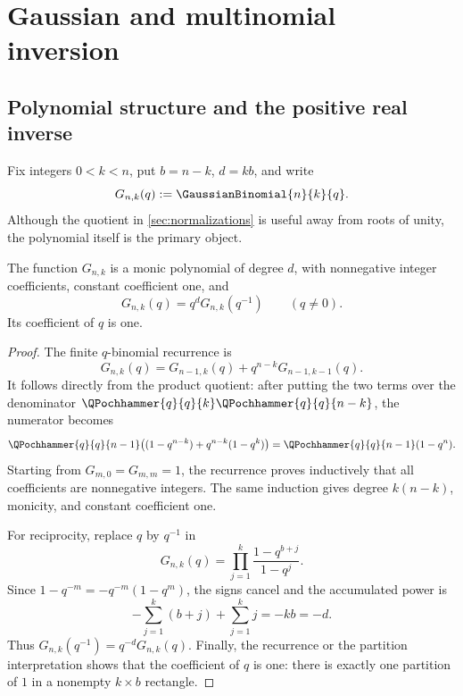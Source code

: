 \chapter{Gaussian and multinomial inversion}
\label{chap:gaussian-multinomial-inversion}

\section{Polynomial structure and the positive real inverse}
\label{sec:gaussian-polynomial}

Fix integers \(0<k<n\), put \(b=n-k\), \(d=kb\), and write
\[
  G_{n,k}(q):=\GaussianBinomial{n}{k}{q}.
\]
Although the quotient in \cref{sec:normalizations} is useful away from roots
of unity, the polynomial itself is the primary object.

\begin{proposition}
\label{prop:gq-positive-palindromic}
The function \(G_{n,k}\) is a monic polynomial of degree \(d\), with
nonnegative integer coefficients, constant coefficient one, and
\[
  G_{n,k}(q)=q^dG_{n,k}(q^{-1})\qquad(q\ne0).
\]
Its coefficient of \(q\) is one.
\end{proposition}

\begin{proof}
The finite \(q\)-binomial recurrence is
\[
  G_{n,k}(q)
  =G_{n-1,k}(q)+q^{n-k}G_{n-1,k-1}(q).
\]
It follows directly from the product quotient: after putting the two terms
over the denominator
\(\QPochhammer{q}{q}{k}\QPochhammer{q}{q}{n-k}\), the numerator becomes
\[
  \QPochhammer{q}{q}{n-1}\bigl((1-q^{n-k})+q^{n-k}(1-q^k)\bigr)
  =\QPochhammer{q}{q}{n-1}(1-q^n).
\]
Starting from \(G_{m,0}=G_{m,m}=1\), the recurrence proves inductively that
all coefficients are nonnegative integers.  The same induction gives degree
\(k(n-k)\), monicity, and constant coefficient one.

For reciprocity, replace \(q\) by \(q^{-1}\) in
\[
  G_{n,k}(q)=\prod_{j=1}^{k}\frac{1-q^{b+j}}{1-q^j}.
\]
Since \(1-q^{-m}=-q^{-m}(1-q^m)\), the signs cancel and the accumulated
power is
\[
  -\sum_{j=1}^{k}(b+j)+\sum_{j=1}^{k}j=-kb=-d.
\]
Thus \(G_{n,k}(q^{-1})=q^{-d}G_{n,k}(q)\).
Finally, the recurrence or the partition interpretation shows that the
coefficient of \(q\) is one: there is exactly one partition of \(1\) in a
nonempty \(k\times b\) rectangle.
\end{proof}

